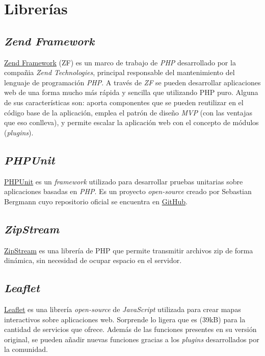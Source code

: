 \section{Librerías}

\subsection{\emph{Zend Framework}}

\href{https://framework.zend.com/}{Zend Framework} (ZF) es un
marco de trabajo de \emph{PHP} desarrollado por la compañia \emph{Zend
Technologies}, principal responsable del mantenimiento del lenguaje de
programación \emph{PHP}. A través de \emph{ZF} se pueden desarrollar aplicaciones web
de una forma mucho más rápida y sencilla que utilizando PHP puro. Alguna
de sus características son: aporta componentes que se pueden
reutilizar en el código base de la aplicación, emplea el patrón de
diseño \emph{MVP} (con las ventajas que eso conlleva), y permite escalar la
aplicación web con el concepto de módulos (\emph{plugins}).

\subsection{\emph{PHPUnit}}

\href{https://phpunit.de/}{PHPUnit} es un \emph{framework} utilizado
para desarrollar pruebas unitarias sobre aplicaciones basadas en \emph{PHP}. Es
un proyecto \emph{open-source} creado por Sebastian Bergmann cuyo
repositorio oficial se encuentra en
\href{https://github.com/sebastianbergmann/phpunit}{GitHub}.

\subsection{\emph{ZipStream}}

\href{https://github.com/maennchen/ZipStream-PHP/tree/0.2.2}{ZipStream}
es una librería de PHP que permite transmitir archivos zip de forma
dinámica, sin necesidad de ocupar espacio en el servidor.

\subsection{\emph{Leaflet}}

\href{https://github.com/Leaflet/Leaflet}{Leaflet} es una librería
\emph{open-source} de \emph{JavaScript} utilizada para crear mapas
interactivos sobre aplicaciones web. Sorprende lo ligera que es (39kB)
para la cantidad de servicios que ofrece. Además de las funciones
presentes en su versión original, se pueden añadir nuevas funciones
gracias a los \emph{plugins} desarrollados por la comunidad.

